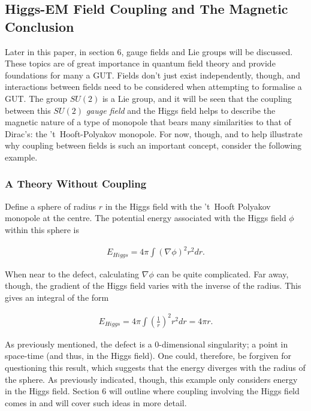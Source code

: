 \documentclass[fleqn, twocolumn, 10pt]{article}
\begin{document}

\subsection{Higgs-EM Field Coupling and The Magnetic Conclusion}

Later in this paper, in section 6, gauge fields and Lie groups will be discussed. These topics are of great importance in quantum field theory and provide foundations for many a GUT. Fields don't just exist independently, though, and interactions between fields need to be considered when attempting to formalise a GUT. The group $SU(2)$ is a Lie group, and it will be seen that the coupling between this $SU(2)$ \textit{gauge field} and the Higgs field helps to describe the magnetic nature of a type of monopole that bears many similarities to that of Dirac's: the 't~Hooft-Polyakov monopole. For now, though, and to help illustrate why coupling between fields is such an important concept, consider the following example.

\subsubsection{A Theory Without Coupling}

Define a sphere of radius $r$ in the Higgs field with the 't~Hooft Polyakov monopole at the centre. The potential energy associated with the Higgs field $\phi$ within this sphere is

\begin{ceqn}
\begin{align*}
E_{Higgs} = 4\pi \int (\nabla\phi)^2 r^2 dr.
\end{align*}
\end{ceqn}
When near to the defect, calculating $\nabla\phi$ can be quite complicated. Far away, though, the gradient of the Higgs field varies with the inverse of the radius. This gives an integral of the form

\begin{ceqn}
\begin{align*}
E_{Higgs} = 4\pi \int \left(\frac{1}{r}\right)^2 r^2 dr = 4\pi r.
\end{align*}
\end{ceqn}

As previously mentioned, the defect is a 0-dimensional singularity; a point in space-time (and thus, in the Higgs field). One could, therefore, be forgiven for questioning this result, which suggests that the energy diverges with the radius of the sphere. As previously indicated, though, this example only considers energy in the Higgs field. Section 6 will outline where coupling involving the Higgs field comes in and will cover such ideas in more detail.
\end{document}
